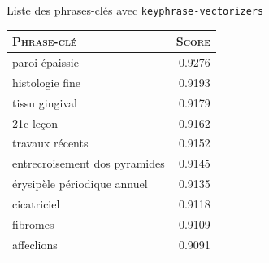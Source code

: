 \begin{frame}{Liste des phrases-clés avec \texttt{keyphrase-vectorizers}}
\begin{table}[!htb]
\footnotesize
    \begin{minipage}{.5\linewidth}
      \centering
        \begin{tabular}{l|r}
         \rowcolor[HTML]{FFCCC9} 
\textsc{\textbf{Phrase-clé}} & \cellcolor[HTML]{DAE8FC}\textsc{\textbf{Score}} \\ \hline
            paroi épaissie & 0.9276 \\
			histologie fine & 0.9193 \\
			tissu gingival & 0.9179 \\
			21c leçon & 0.9162 \\
			travaux récents & 0.9152 \\
			entrecroisement dos pyramides & 0.9145 \\
			érysipèle périodique annuel & 0.9135 \\
			cicatriciel & 0.9118 \\
			fibromes & 0.9109 \\
			affeclions & 0.9091
        \end{tabular}
    \end{minipage}%
    \begin{minipage}{.5\linewidth}
      \centering
        \begin{tabular}{l|r}

\end{tabular}
\end{minipage}
\end{table}
\end{frame}
